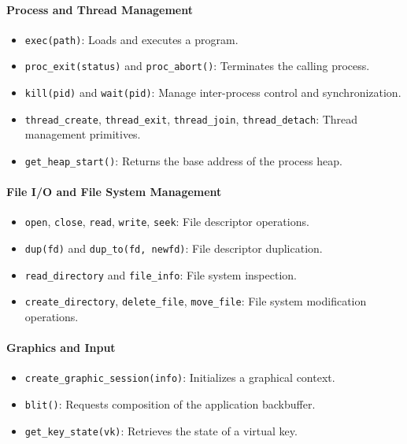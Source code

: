\documentclass[a4paper,10pt,twoside]{report}
\theoremstyle{definition}
\begin{document}
\paragraph{Process and Thread Management}
\begin{itemize}
    \item \texttt{exec(path)}: Loads and executes a program.
    \item \texttt{proc\_exit(status)} and \texttt{proc\_abort()}: Terminates the calling process.
    \item \texttt{kill(pid)} and \texttt{wait(pid)}: Manage inter-process control and synchronization.
    \item \texttt{thread\_create}, \texttt{thread\_exit}, \texttt{thread\_join}, \texttt{thread\_detach}: Thread management primitives.
    \item \texttt{get\_heap\_start()}: Returns the base address of the process heap.
\end{itemize}

\paragraph{File I/O and File System Management}
\begin{itemize}
    \item \texttt{open}, \texttt{close}, \texttt{read}, \texttt{write}, \texttt{seek}: File descriptor operations.
    \item \texttt{dup(fd)} and \texttt{dup\_to(fd, newfd)}: File descriptor duplication.
    \item \texttt{read\_directory} and \texttt{file\_info}: File system inspection.
    \item \texttt{create\_directory}, \texttt{delete\_file}, \texttt{move\_file}: File system modification operations.
\end{itemize}

\paragraph{Graphics and Input}
\begin{itemize}
    \item \texttt{create\_graphic\_session(info)}: Initializes a graphical context.
    \item \texttt{blit()}: Requests composition of the application backbuffer.
    \item \texttt{get\_key\_state(vk)}: Retrieves the state of a virtual key.
\end{itemize}
\end{document}
